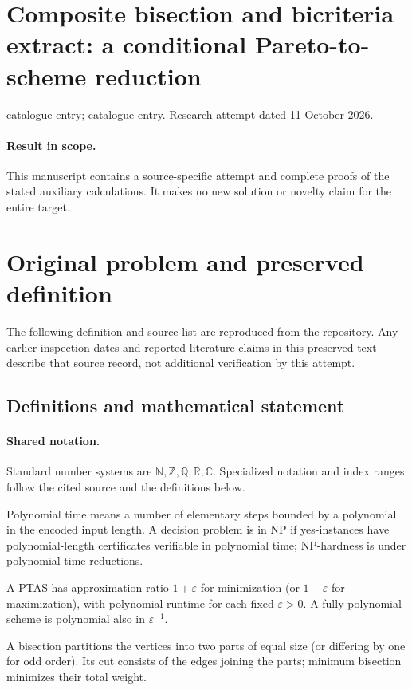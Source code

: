 \documentclass[11pt]{article}
\begin{document}
\section*{Composite bisection and bicriteria extract: a conditional Pareto-to-scheme reduction}
\noindent catalogue entry; catalogue entry. Research attempt dated 11 October 2026.
\paragraph{Result in scope.}This manuscript contains a source-specific attempt and complete proofs of the stated auxiliary calculations. It makes no new solution or novelty claim for the entire target.
\section{Original problem and preserved definition}
The following definition and source list are reproduced from the repository. Any earlier inspection dates and reported literature claims in this preserved text describe that source record, not additional verification by this attempt.
\subsection{Definitions and mathematical statement}

\paragraph{Shared notation.}Standard number systems are $\mathbb N,\mathbb Z,\mathbb Q,\mathbb R,\mathbb C$. Specialized notation and index ranges follow the cited source and the definitions below.


Polynomial time means a number of elementary steps bounded by a polynomial in the encoded input length. A decision problem is in $\mathrm{NP}$ if yes-instances have polynomial-length certificates verifiable in polynomial time; NP-hardness is under polynomial-time reductions.

A PTAS has approximation ratio $1+\varepsilon$ for minimization (or $1-\varepsilon$ for maximization), with polynomial runtime for each fixed $\varepsilon>0$. A fully polynomial scheme is polynomial also in $\varepsilon^{-1}$.

A bisection partitions the vertices into two parts of equal size (or differing by one for odd order). Its cut consists of the edges joining the parts; minimum bisection minimizes their total weight.
\end{document}
